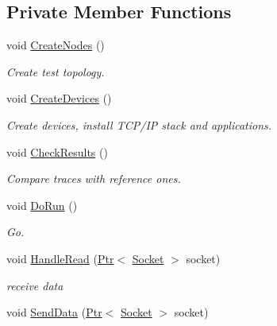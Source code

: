 \subsection*{Private Member Functions}
\begin{DoxyCompactItemize}
\item 
void \hyperlink{classBug772ChainTest_a8afa0710a496d8d1b85abee049afb120}{Create\+Nodes} ()
\begin{DoxyCompactList}\small\item\em Create test topology. \end{DoxyCompactList}\item 
void \hyperlink{classBug772ChainTest_a9dfdee167ab354dd596e13d1a873e50a}{Create\+Devices} ()
\begin{DoxyCompactList}\small\item\em Create devices, install T\+C\+P/\+IP stack and applications. \end{DoxyCompactList}\item 
void \hyperlink{classBug772ChainTest_adbcdc4b89a09e559a59047bd282cba86}{Check\+Results} ()
\begin{DoxyCompactList}\small\item\em Compare traces with reference ones. \end{DoxyCompactList}\item 
void \hyperlink{classBug772ChainTest_a28c0cb91d146d6b3fdfb86dc8dc1f5b6}{Do\+Run} ()
\begin{DoxyCompactList}\small\item\em Go. \end{DoxyCompactList}\item 
void \hyperlink{classBug772ChainTest_a2599f993595c4c5f3c5afdb417775896}{Handle\+Read} (\hyperlink{classns3_1_1Ptr}{Ptr}$<$ \hyperlink{classns3_1_1Socket}{Socket} $>$ socket)
\begin{DoxyCompactList}\small\item\em receive data \end{DoxyCompactList}\item 
void \hyperlink{classBug772ChainTest_aa2ca782ce38d9b2435001b878650146c}{Send\+Data} (\hyperlink{classns3_1_1Ptr}{Ptr}$<$ \hyperlink{classns3_1_1Socket}{Socket} $>$ socket)
\end{DoxyCompactItemize}
